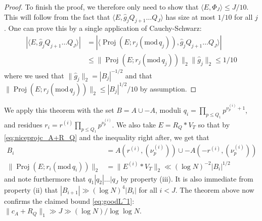 \documentclass[11pt, reqno]{amsart}
\newcommand{\md}[1]{\ensuremath{(\mbox{mod}\, #1)}}
\DeclareMathOperator{\Proj}{Proj}
\begin{document}
\begin{proof}
\medskip

To finish the proof, we therefore only need to show that $\langle E,\Phi_J\rangle \leqslant J/10$. This will follow from the fact that $\langle E,\hat{g}_jQ_{j+1}\dots Q_J \rangle$ has size at most $1/10$ for all $j$. One can prove this by a single application of Cauchy-Schwarz:
\begin{align*}|\langle E, \hat{g}_jQ_{j+1}\dots Q_{J}\rangle|&=|\langle \Proj(E; r_j\md{q_j}), \hat{g}_jQ_{j+1}\dots Q_J\rangle|\\
&\leqslant \lVert \Proj(E; r_j\md{q_j})\rVert_2\lVert \hat{g}_j\rVert_2\leqslant 1/10\end{align*} where we used that $\lVert \hat{g}_j\rVert_2=|B_j|^{-1/2}$ and that $\lVert \Proj(E; r_j\md{q_j})\rVert_2 \leqslant |B_j|^{1/2}/10$ by assumption.

\end{proof}
We apply this theorem with the set $B=A\cup -A$, moduli $q_i= \prod_{p\leqslant Q_1} p^{\nu_p^{(i)}+1}$, and residues $r_i=r^{(i)} \prod_{p \leqslant Q_1}p^{\nu_p^{(i)}}$. We also take $E= R_Q*V_T$ so that by \eqref{eq:niceprojc_A+R_Q} and the inequality right after, we get that
\begin{align*}
    B_i&= A(r^{(i)}, (\nu_p^{(i)})) \cup -A(-r^{(i)},(\nu_p^{(i)}))\\
    \lVert \Proj(E; r_i\md{q_i})\rVert_2 &=\lVert E^{(i)}*V_T\rVert_2\ll (\log N)^{-2}|B_i|^{1/2}
\end{align*} and note furthermore that $q_1|q_2|\dots|q_J$ by property (iii). It is also immediate from property (ii) that $|B_{i+1}|\gg (\log N)^4|B_i|$ for all $i<J$. The theorem above now confirms the claimed bound \eqref{eq:goodL^1}: $\lVert c_A+R_Q\rVert_1\gg J\gg (\log N)/\log\log N$.
\end{document}
